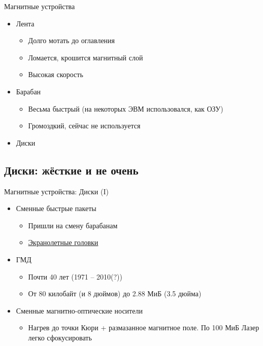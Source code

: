 \documentclass[xetex,aspectratio=43]{beamer}
\begin{document}
\begin{frame}{Магнитные устройства}

\begin{itemize}
\tightlist
\item
  Лента

  \begin{itemize}
  \tightlist
  \item
    Долго мотать до оглавления
  \item
    Ломается, крошится магнитный слой
  \item
    Высокая скорость
  \end{itemize}
\item
  Барабан

  \begin{itemize}
  \tightlist
  \item
    Весьма быстрый (на некоторых ЭВМ использовался, как ОЗУ)
  \item
    Громоздкий, сейчас не используется
  \end{itemize}
\item
  Диски
\end{itemize}
\end{frame}

\subsection{Диски: жёсткие и не очень}

\begin{frame}{Магнитные устройства: Диски (I)}
\begin{itemize}
\tightlist
\item
  Сменные быстрые пакеты

  \begin{itemize}
  \tightlist
  \item
    Пришли на смену барабанам
  \item
    \href{http://www.ixbt.com/storage/hdd50years.shtml}{Экранолетные
    головки}
  \end{itemize}
\item
  ГМД

  \begin{itemize}
  \tightlist
  \item
    Почти 40 лет (1971 -- 2010(?))
  \item
    От 80 килобайт (и 8 дюймов) до 2.88 МиБ (3.5 дюйма)
  \end{itemize}
\item
  Сменные магнитно-оптические носители

  \begin{itemize}
  \tightlist
  \item
    Нагрев до точки Кюри + размазанное магнитное поле. По 100 МиБ Лазер
    легко сфокусировать
  \end{itemize}
\end{itemize}
\end{frame}
\end{document}
